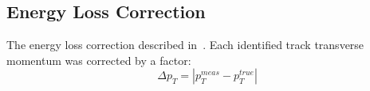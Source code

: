 \subsection{Energy Loss Correction}\label{section:star_energyLoss}
The energy loss correction described in~\cite{supplementaryNote}. Each identified track transverse momentum was corrected by a factor:
\begin{equation}
\Delta p_T = |p_T^{meas}-p_T^{true}|
\end{equation}


